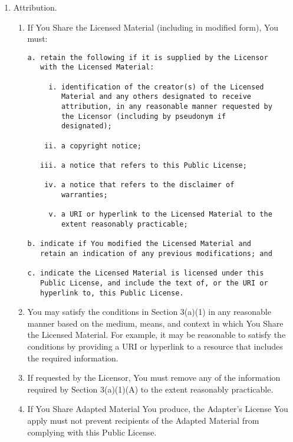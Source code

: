 \documentclass[]{article}
\begin{document}
\begin{enumerate}
\def\labelenumi{\alph{enumi}.}
\item
  Attribution.

  \begin{enumerate}
  \def\labelenumii{\arabic{enumii}.}
  \item
    If You Share the Licensed Material (including in modified form), You
    must:

\begin{verbatim}
a. retain the following if it is supplied by the Licensor
   with the Licensed Material:

     i. identification of the creator(s) of the Licensed
        Material and any others designated to receive
        attribution, in any reasonable manner requested by
        the Licensor (including by pseudonym if
        designated);

    ii. a copyright notice;

   iii. a notice that refers to this Public License;

    iv. a notice that refers to the disclaimer of
        warranties;

     v. a URI or hyperlink to the Licensed Material to the
        extent reasonably practicable;

b. indicate if You modified the Licensed Material and
   retain an indication of any previous modifications; and

c. indicate the Licensed Material is licensed under this
   Public License, and include the text of, or the URI or
   hyperlink to, this Public License.
\end{verbatim}
  \item
    You may satisfy the conditions in Section 3(a)(1) in any reasonable
    manner based on the medium, means, and context in which You Share
    the Licensed Material. For example, it may be reasonable to satisfy
    the conditions by providing a URI or hyperlink to a resource that
    includes the required information.
  \item
    If requested by the Licensor, You must remove any of the information
    required by Section 3(a)(1)(A) to the extent reasonably practicable.
  \item
    If You Share Adapted Material You produce, the Adapter's License You
    apply must not prevent recipients of the Adapted Material from
    complying with this Public License.
  \end{enumerate}
\end{enumerate}
\end{document}

